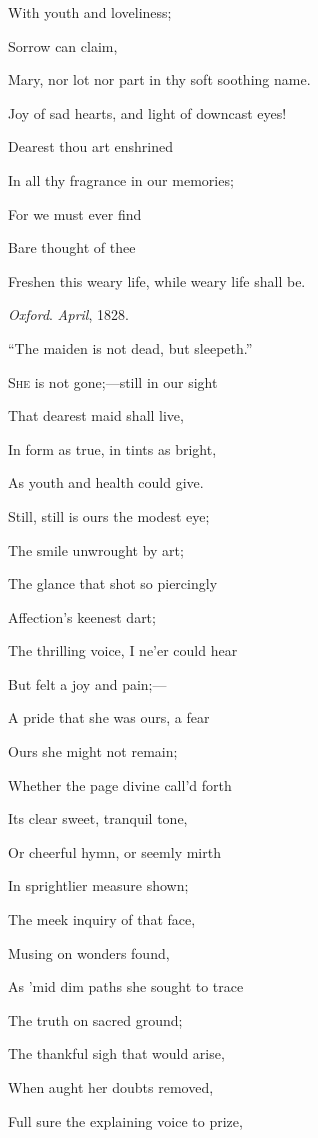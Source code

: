 With youth
and loveliness;

Sorrow can claim,

Mary, nor lot nor part in thy soft soothing name.

Joy of sad hearts, and light of downcast eyes!

Dearest thou
art enshrined

In all thy fragrance in our memories;

For we must
ever find

Bare thought of thee

Freshen this weary life, while weary life shall be.

\emph{Oxford}.
\emph{April}, 1828.


``The maiden is not dead,
but sleepeth.''

S\textsc{he} is not gone;—still in our sight

That dearest maid shall live,

In form as true, in tints as bright,

As youth and health could give.

Still, still is ours the modest eye;

The smile unwrought by art;

The glance that shot so piercingly

Affection's keenest dart;

The thrilling voice, I ne'er could hear

But felt a joy and pain;—

A pride that she was ours, a fear

Ours she might not remain; 

Whether the page divine call'd forth

Its clear sweet, tranquil tone,

Or cheerful hymn, or seemly mirth

In sprightlier measure shown;

The meek inquiry of that face,

Musing on wonders found,

As 'mid dim paths she sought to trace

The truth on sacred ground;

The thankful sigh that would arise,

When aught her doubts removed,

Full sure the explaining voice to prize,

